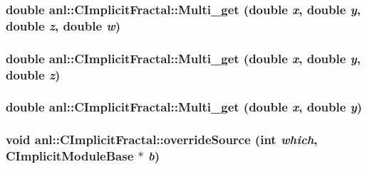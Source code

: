 \label{classanl_1_1CImplicitFractal_a8f3a770fa04487a43358727073db6ad6}
\hypertarget{classanl_1_1CImplicitFractal_a5229533eab3ba8c7350ded69ad05ae1d}{
\subsubsection[{Multi\_\-get}]{\setlength{\rightskip}{0pt plus 5cm}double anl::CImplicitFractal::Multi\_\-get (double {\em x}, \/  double {\em y}, \/  double {\em z}, \/  double {\em w})}}
\label{classanl_1_1CImplicitFractal_a5229533eab3ba8c7350ded69ad05ae1d}
\hypertarget{classanl_1_1CImplicitFractal_ac4d9ee8b416db16e26b370d8af6d9a46}{
\subsubsection[{Multi\_\-get}]{\setlength{\rightskip}{0pt plus 5cm}double anl::CImplicitFractal::Multi\_\-get (double {\em x}, \/  double {\em y}, \/  double {\em z})}}
\label{classanl_1_1CImplicitFractal_ac4d9ee8b416db16e26b370d8af6d9a46}
\hypertarget{classanl_1_1CImplicitFractal_ac5ff3cd0f009c7e77527135bb5f1e15e}{
\subsubsection[{Multi\_\-get}]{\setlength{\rightskip}{0pt plus 5cm}double anl::CImplicitFractal::Multi\_\-get (double {\em x}, \/  double {\em y})}}
\label{classanl_1_1CImplicitFractal_ac5ff3cd0f009c7e77527135bb5f1e15e}
\hypertarget{classanl_1_1CImplicitFractal_a2363ebe6c57e93c457280bcad216c25a}{
\subsubsection[{overrideSource}]{\setlength{\rightskip}{0pt plus 5cm}void anl::CImplicitFractal::overrideSource (int {\em which}, \/  {\bf CImplicitModuleBase} $\ast$ {\em b})}}
